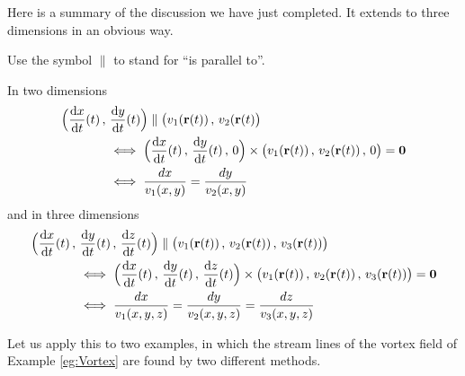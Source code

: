 Here is a summary of the discussion we have just completed. It extends to three dimensions in an obvious way.
\begin{impeqn}\label{eq:VFstreamLineB}
Use the symbol $\parallel$ to stand for ``is parallel to''.

\noindent
In two dimensions
\begin{align*}
&\Big(\diff{x}{t}(t)\,,\,\diff{y}{t}(t)\Big) \parallel
\big(v_1(\vr(t))\,,\,v_2(\vr(t)\big) \\
&\hskip0.5in\iff  
\Big(\diff{x}{t}(t)\,,\,\diff{y}{t}(t)\,,\,0\Big)\times
\big(v_1(\vr(t))\,,\,v_2(\vr(t))\,,\,0\big) = \vZero \\
&\hskip0.5in\iff \frac{dx}{v_1(x,y)}=\frac{dy}{v_2(x,y)}
\end{align*}
and in three dimensions 
\begin{align*}
&\Big(\diff{x}{t}(t)\,,\,\diff{y}{t}(t)\,,\,\diff{z}{t}(t)\Big) \parallel
\big(v_1(\vr(t))\,,\,v_2(\vr(t))\,,\,v_3(\vr(t))\big) \\
&\hskip0.5in\iff  
\Big(\diff{x}{t}(t)\,,\,\diff{y}{t}(t)\,,\,\diff{z}{t}(t)\Big)\times
\big(v_1(\vr(t))\,,\,v_2(\vr(t))\,,\,v_3(\vr(t))\big) = \vZero \\
&\hskip0.5in\iff \frac{dx}{v_1(x,y,z)}=\frac{dy}{v_2(x,y,z)}=\frac{dz}{v_3(x,y,z)}
\end{align*}
\end{impeqn}
Let us apply this to two examples, in which the stream lines of the vortex field 
of Example \ref{eg:Vortex} are found by two different methods.

